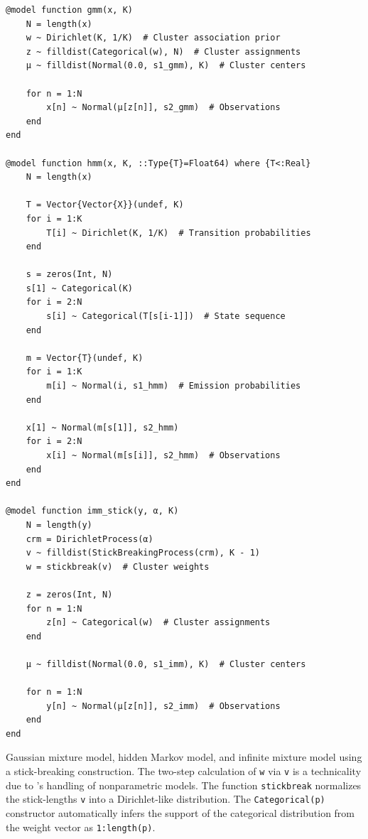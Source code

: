 
\begin{lstfloat}[p]
\begin{lstlisting}[style=lstfloat]
@model function gmm(x, K)
    N = length(x)
    w ~ Dirichlet(K, 1/K)  # Cluster association prior
    z ~ filldist(Categorical(w), N)  # Cluster assignments
    μ ~ filldist(Normal(0.0, s1_gmm), K)  # Cluster centers

    for n = 1:N
        x[n] ~ Normal(μ[z[n]], s2_gmm)  # Observations
    end
end

@model function hmm(x, K, ::Type{T}=Float64) where {T<:Real}
    N = length(x)

    T = Vector{Vector{X}}(undef, K)
    for i = 1:K
        T[i] ~ Dirichlet(K, 1/K)  # Transition probabilities
    end
    
    s = zeros(Int, N)
    s[1] ~ Categorical(K)
    for i = 2:N
        s[i] ~ Categorical(T[s[i-1]])  # State sequence
    end
    
    m = Vector{T}(undef, K)
    for i = 1:K
        m[i] ~ Normal(i, s1_hmm)  # Emission probabilities
    end
    
    x[1] ~ Normal(m[s[1]], s2_hmm)
    for i = 2:N
        x[i] ~ Normal(m[s[i]], s2_hmm)  # Observations
    end
end

@model function imm_stick(y, α, K)
    N = length(y)
    crm = DirichletProcess(α)
    v ~ filldist(StickBreakingProcess(crm), K - 1)
    w = stickbreak(v)  # Cluster weights
    
    z = zeros(Int, N)
    for n = 1:N
        z[n] ~ Categorical(w)  # Cluster assignments
    end

    μ ~ filldist(Normal(0.0, s1_imm), K)  # Cluster centers

    for n = 1:N
        y[n] ~ Normal(μ[z[n]], s2_imm)  # Observations
    end
end
\end{lstlisting}
  \caption{Gaussian mixture model, hidden Markov model, and infinite mixture model using a
    stick-breaking construction.  The two-step calculation of \texttt{w} via \texttt{v} is a
    technicality due to \turingjl{}'s handling of nonparametric models.  The function
    \texttt{stickbreak} normalizes the stick-lengths \texttt{v} into a Dirichlet-like distribution.
    The \texttt{Categorical(p)} constructor automatically infers the support of the categorical
    distribution from the weight vector as \texttt{1:length(p)}.}
  \label{lst:evaluation-models}
\end{lstfloat}

